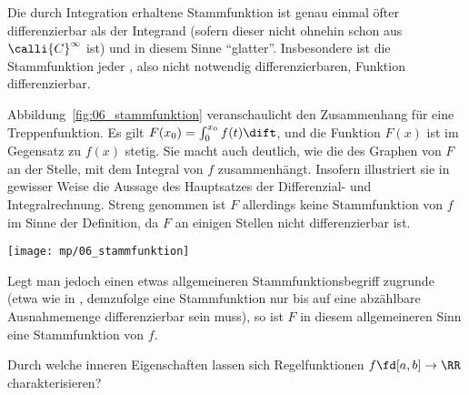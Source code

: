 \begin{antwort}
Die durch Integration erhaltene Stammfunktion ist genau einmal öfter 
differenzierbar als der Integrand 
(sofern dieser nicht ohnehin schon aus $\calli{C}^\infty$ ist) 
und in diesem Sinne "`glatter"'. Insbesondere ist 
die Stammfunktion jeder , also nicht 
notwendig differenzierbaren, Funktion differenzierbar.


Abbildung~\ref{fig:06_stammfunktion} veranschaulicht den Zusammenhang für eine 
Treppenfunktion. Es gilt $F(x_0) = \int_0^{x_0} f(t) \dift$, und die 
Funktion $F(x)$ ist im Gegensatz zu $f(x)$ stetig. Sie macht auch 
deutlich, wie die  des Graphen von $F$ an der Stelle, 
mit dem Integral von $f$ zusammenhängt. 
Insofern illustriert sie in gewisser Weise die Aussage des 
Hauptsatzes der Differenzial- und Integralrechnung. 
Streng genommen ist $F$ allerdings keine Stammfunktion von $f$ 
im Sinne der Definition, da $F$ an einigen Stellen nicht 
differenzierbar ist.    

\begin{center}
  \texttt{[image: mp/06\_stammfunktion]}
  \label{fig:06_stammfunktion}
\end{center}

Legt man jedoch einen etwas allgemeineren Stammfunktionsbegriff 
zugrunde (etwa wie in \citep{Koenig}, demzufolge eine 
Stammfunktion nur bis auf eine abzählbare 
Ausnahmemenge differenzierbar sein muss), so ist $F$ in diesem allgemeineren 
Sinn eine Stammfunktion von $f$. 
\AntEnd
\end{antwort} 

\begin{frage}\label{06_reig}
Durch welche inneren Eigenschaften lassen sich Regelfunktionen 
$f\fd [a,b]\to \RR$ charakterisieren?
\end{frage}

